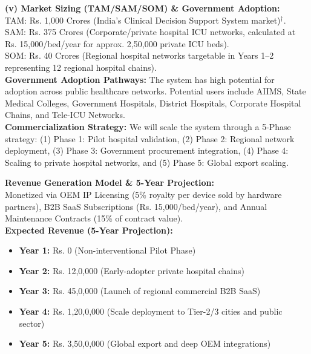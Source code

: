 \documentclass[11pt, a4paper]{article}
\begin{document}
\textbf{(v) Market Sizing (TAM/SAM/SOM) \& Government Adoption:}\\
TAM: Rs. 1,000 Crores (India's Clinical Decision Support System market)$^\dagger$.\\
SAM: Rs. 375 Crores (Corporate/private hospital ICU networks, calculated at Rs. 15,000/bed/year for approx. 2,50,000 private ICU beds).\\
SOM: Rs. 40 Crores (Regional hospital networks targetable in Years 1--2 representing 12 regional hospital chains).\\
\textbf{Government Adoption Pathways:} The system has high potential for adoption across public healthcare networks. Potential users include AIIMS, State Medical Colleges, Government Hospitals, District Hospitals, Corporate Hospital Chains, and Tele-ICU Networks.\\
\textbf{Commercialization Strategy:} We will scale the system through a 5-Phase strategy: (1) Phase 1: Pilot hospital validation, (2) Phase 2: Regional network deployment, (3) Phase 3: Government procurement integration, (4) Phase 4: Scaling to private hospital networks, and (5) Phase 5: Global export scaling.

\vspace{0.2cm}
\textbf{Revenue Generation Model \& 5-Year Projection:}\\
Monetized via OEM IP Licensing (5\% royalty per device sold by hardware partners), B2B SaaS Subscriptions (Rs. 15,000/bed/year), and Annual Maintenance Contracts (15\% of contract value).\\[0.1cm]
\textbf{Expected Revenue (5-Year Projection):}
\begin{itemize}
    \item \textbf{Year 1:} Rs. 0 (Non-interventional Pilot Phase)
    \item \textbf{Year 2:} Rs. 12,0,000 (Early-adopter private hospital chains)
    \item \textbf{Year 3:} Rs. 45,0,000 (Launch of regional commercial B2B SaaS)
    \item \textbf{Year 4:} Rs. 1,20,0,000 (Scale deployment to Tier-2/3 cities and public sector)
    \item \textbf{Year 5:} Rs. 3,50,0,000 (Global export and deep OEM integrations)
\end{itemize}
\end{document}
